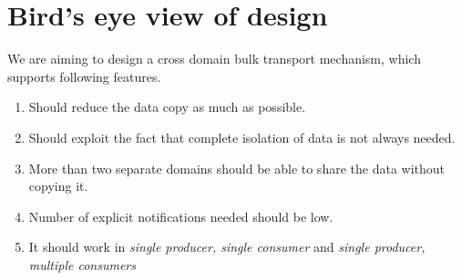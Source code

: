 \documentclass[a4paper,twoside]{report} %
\begin{document}
\section{Bird's eye view of design}
We are aiming to design a cross domain bulk transport mechanism,
which supports following features.
\begin{enumerate}
  \item Should reduce the data copy as much as possible.
  \item Should exploit the fact that complete isolation of data
  is not always needed.
  \item More than two separate domains should be able to share
  the data without copying it.
  \item Number of explicit notifications needed should be low.
  \item It should work in \textit{single producer, single consumer}
  and \textit{single producer, multiple consumers}
\end{enumerate}
\end{document}
